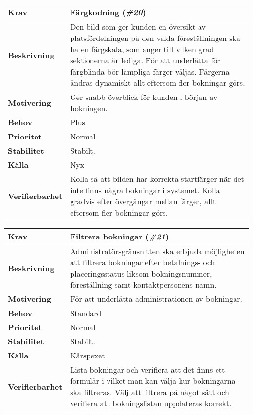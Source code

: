 \documentclass[a4paper, twoside, 11pt, titlepage]{article}
\begin{document}
	\begin{tabular} { p{2.6cm} p{12.5cm} }
		\hline
		\sffamily\textbf{Krav} & Färgkodning (\emph{\#20})  \\
		\hline
		\sffamily\textbf{Beskrivning} & Den bild som ger kunden en översikt av platsfördelningen på den valda föreställningen ska ha en färgskala, som anger till vilken grad sektionerna är lediga. För att underlätta för färgblinda bör lämpliga färger väljas. Färgerna ändras dynamiskt allt eftersom fler bokningar görs.  \\
		\hline
		\sffamily\textbf{Motivering} & Ger snabb överblick för kunden i början av bokningen.  \\
		\hline
		\sffamily\textbf{Behov} & Plus  \\
		\hline
		\sffamily\textbf{Prioritet} & Normal  \\
		\hline
		\sffamily\textbf{Stabilitet} & Stabilt.  \\
		\hline
		\sffamily\textbf{Källa} & Nyx  \\
		\hline
		\sffamily\textbf{Verifierbarhet} & Kolla så att bilden har korrekta startfärger när det inte finns några bokningar i systemet. Kolla gradvis efter övergångar mellan färger, allt eftersom fler bokningar görs.   \\
		\hline
	\end{tabular}
	\vspace{6mm}

	\begin{tabular} { p{2.6cm} p{12.5cm} }
		\hline
		\sffamily\textbf{Krav} & Filtrera bokningar (\emph{\#21})  \\
		\hline
		\sffamily\textbf{Beskrivning} & Administratörsgränsnitten ska erbjuda möjligheten att filtrera bokningar efter betalnings- och placeringsstatus liksom bokningsnummer, föreställning samt kontaktpersonens namn.  \\
		\hline
		\sffamily\textbf{Motivering} & För att underlätta administrationen av bokningar.  \\
		\hline
		\sffamily\textbf{Behov} & Standard  \\
		\hline
		\sffamily\textbf{Prioritet} & Normal  \\
		\hline
		\sffamily\textbf{Stabilitet} & Stabilt.  \\
		\hline
		\sffamily\textbf{Källa} & Kårspexet  \\
		\hline
		\sffamily\textbf{Verifierbarhet} & Lista bokningar och verifiera att det finns ett formulär i vilket man kan välja hur bokningarna ska filtreras. Välj att filtrera på något sätt och verifiera att bokningslistan uppdateras korrekt.  \\
		\hline
	\end{tabular}
	\vspace{6mm}
\end{document}
